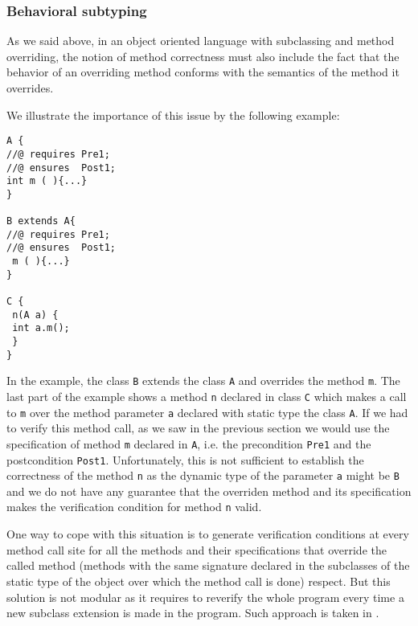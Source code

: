 \subsubsection{Behavioral subtyping}
As we said above, in an object oriented language with subclassing and 
method overriding, the notion of method correctness 
must also include the fact that the behavior of an overriding 
 method conforms with the semantics of the method it overrides.


We illustrate the importance of this issue by the following example: 
\begin{lstlisting}[frame=trbl]
A {
//@ requires Pre1;
//@ ensures  Post1;
int m ( ){...}
}

B extends A{  
//@ requires Pre1;
//@ ensures  Post1;
 m ( ){...}
}

C {
 n(A a) {
 int a.m();
 }
}
\end{lstlisting}

 In the example,  the class \lstinline!B! extends the class  
 \lstinline!A!   and overrides the method \lstinline!m!. The last part of the
 example shows a method \lstinline!n! declared in class 
 \lstinline!C! which makes a call to  \lstinline!m! over the method parameter
  \lstinline!a!  declared with static type the class \lstinline!A!.  If we had
 to verify this method call, as we saw in the previous section we would use
 the specification of method \lstinline!m! declared in \lstinline!A!, i.e. the
 precondition \lstinline!Pre1! and the postcondition  \lstinline!Post1!.
 Unfortunately, this is not sufficient to establish the correctness of the
 method \lstinline!n! as the dynamic type of the parameter  \lstinline!a!
 might be  \lstinline!B! and we do not have any guarantee that the overriden
 method and its specification makes the verification condition for method
 \lstinline!n! valid. 

 One way to cope with this situation is  to generate verification conditions
 at every method call site
 for all the methods and their specifications that  override the called method (methods with the
 same signature declared in the subclasses of the static type of the object over
 which the method call is done) respect. But this solution is not modular as
 it requires to reverify the whole program every time a new subclass extension
 is made in the program. Such approach is taken in \cite{AP98LFT}.

